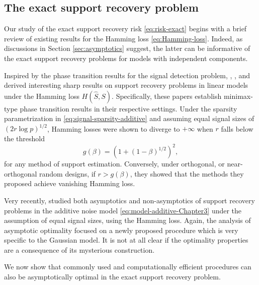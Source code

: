 \subsection{The exact support recovery problem}
\label{subsec:exact-support-recovery-Gaussian}

Our study of the exact support recovery risk \eqref{eq:risk-exact} begins with a brief review of existing results for the Hamming loss \eqref{eq:Hamming-loss}.
Indeed, as discussions in Section \ref{sec:asymptotics} suggest, the latter can be informative of the exact support recovery problems for models with independent components.

Inspired by the phase transition results for the signal detection problem, \cite{ji2012ups}, \citet{genovese2012comparison}, and \cite{jin2014optimality} derived interesting sharp results on support recovery problems in linear models under the Hamming loss $H(\widehat S, S)$.
Specifically, these papers establish minimax-type phase transition results in their respective settings. 
Under the sparsity parametrization in \eqref{eq:signal-sparsity-additive} and assuming equal signal sizes of ${(2r\log{p})^{1/2}}$, Hamming losses were shown to diverge to $+\infty$ when $r$ falls below the threshold
\begin{equation} \label{eq:strong-classification-boundary-Gaussian}
    g(\beta) = (1 + (1 - \beta)^{1/2})^2,
\end{equation}
for any method of support estimation.
Conversely, under orthogonal, or near-orthogonal random designs, if $r>g(\beta)$, they showed that the methods they proposed achieve vanishing Hamming loss.

Very recently, \citet{butucea2018variable}\; studied both asymptotics and non-asymptotics of support recovery problems in the additive noise model \eqref{eq:model-additive-Chapter3} under the assumption of equal signal sizes, using the Hamming loss.
Again, the analysis of asymptotic optimality focused on a newly proposed procedure which is very specific to the Gaussian model.
It is not at all clear if the optimality properties are a consequence of its mysterious construction.

We now show that commonly used and computationally efficient procedures can also be asymptotically optimal in the exact support recovery problem.

